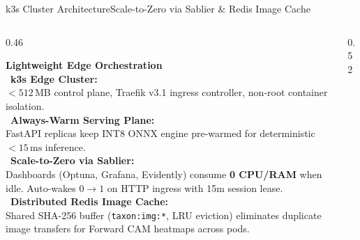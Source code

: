 \documentclass[aspectratio=169,10pt]{beamer}
\begin{document}
\begin{frame}{k3s Cluster Architecture}{Scale-to-Zero via Sablier \& Redis Image Cache}
    \begin{columns}[T]
        \begin{column}{0.46\textwidth}
            \begin{tcolorbox}[enhanced, colback=SlateLight, colframe=BlueAccent!50, boxrule=0.6pt, arc=3pt, left=6pt, right=6pt, top=3pt, bottom=3pt]
                \raggedright\footnotesize
                \textbf{\color{BlueAccent} Lightweight Edge Orchestration}\\[2pt]
                \textbullet\ \textbf{k3s Edge Cluster:}\\
                $<512$\,MB control plane, Traefik v3.1 ingress controller, non-root container isolation.\\[2pt]
                \textbullet\ \textbf{Always-Warm Serving Plane:}\\
                FastAPI replicas keep INT8 ONNX engine pre-warmed for deterministic $<15\,\text{ms}$ inference.\\[2pt]
                \textbullet\ \textbf{Scale-to-Zero via Sablier:}\\
                Dashboards (Optuna, Grafana, Evidently) consume \textbf{0 CPU/RAM} when idle. Auto-wakes $0 \to 1$ on HTTP ingress with 15m session lease.\\[2pt]
                \textbullet\ \textbf{Distributed Redis Image Cache:}\\
                Shared SHA-256 buffer (\texttt{taxon:img:*}, LRU eviction) eliminates duplicate image transfers for Forward CAM heatmaps across pods.
            \end{tcolorbox}
        \end{column}

        \begin{column}{0.52\textwidth}
            \centering
\end{column}
\end{columns}
\end{frame}
\end{document}
